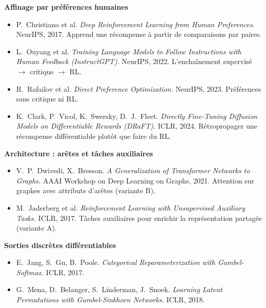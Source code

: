 \documentclass[11pt,a4paper]{article}
\begin{document}
\textbf{Affinage par préférences humaines}
\begin{itemize}
  \item P.~Christiano et al. \emph{Deep Reinforcement Learning from Human Preferences.} NeurIPS, 2017. Apprend une récompense à partir de comparaisons par paires.
  \item L.~Ouyang et al. \emph{Training Language Models to Follow Instructions with Human Feedback (InstructGPT).} NeurIPS, 2022. L'enchaînement supervisé $\to$ critique $\to$ RL.
  \item R.~Rafailov et al. \emph{Direct Preference Optimization.} NeurIPS, 2023. Préférences sans critique ni RL.
  \item K.~Clark, P.~Vicol, K.~Swersky, D.~J.~Fleet. \emph{Directly Fine-Tuning Diffusion Models on Differentiable Rewards (DRaFT).} ICLR, 2024. Rétropropager une récompense différentiable plutôt que faire du RL.
\end{itemize}

\textbf{Architecture : arêtes et tâches auxiliaires}
\begin{itemize}
  \item V.~P.~Dwivedi, X.~Bresson. \emph{A Generalization of Transformer Networks to Graphs.} AAAI Workshop on Deep Learning on Graphs, 2021. Attention sur graphes avec attributs d'arêtes (variante B).
  \item M.~Jaderberg et al. \emph{Reinforcement Learning with Unsupervised Auxiliary Tasks.} ICLR, 2017. Tâches auxiliaires pour enrichir la représentation partagée (variante A).
\end{itemize}

\textbf{Sorties discrètes différentiables}
\begin{itemize}
  \item E.~Jang, S.~Gu, B.~Poole. \emph{Categorical Reparameterization with Gumbel-Softmax.} ICLR, 2017.
  \item G.~Mena, D.~Belanger, S.~Linderman, J.~Snoek. \emph{Learning Latent Permutations with Gumbel-Sinkhorn Networks.} ICLR, 2018.
\end{itemize}
\end{document}
